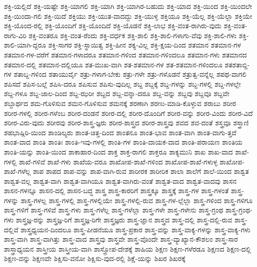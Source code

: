 {ಶಕ್ತಿ-ಯಲ್ಲಿದೆ
ಶಕ್ತಿ-ಯಷ್ಟೇ
ಶಕ್ತಿ-ಯಾಗಲಿ
ಶಕ್ತಿ-ಯಾಗಿ
ಶಕ್ತಿ-ಯಾಗಿರ-ಬಹುದು
ಶಕ್ತಿ-ಯಾದ
ಶಕ್ತಿ-ಯಿಂದ
ಶಕ್ತಿ-ಯಿಂದಲೇ
ಶಕ್ತಿ-ಯಿಂದಾ-ಗಲಿ
ಶಕ್ತಿ-ಯಿದೆ
ಶಕ್ತಿಯು
ಶಕ್ತಿ-ಯುತ-ವಾದದ್ದು
ಶಕ್ತಿ-ಯುಳ್ಳ
ಶಕ್ತಿಯೂ
ಶಕ್ತಿ-ಯೆಲ್ಲ
ಶಕ್ತಿ-ಯೆಲ್ಲಾ
ಶಕ್ತಿಯೇ
ಶಕ್ತಿ-ಯೊಂದ-ರಲ್ಲಿ
ಶಕ್ತಿ-ಯೊಂದಿಗೆ
ಶಕ್ತಿ-ಯೊಂದಿದೆ
ಶಕ್ತಿ-ಯೊಡನೆ
ಶಕ್ತಿ-ಲಾಭ
ಶಕ್ತಿ-ವಂತ-ರಾಗಿರು-ವುದು
ಶಕ್ತಿ-ವಂತ-ರಾಗು-ವಿರಿ
ಶಕ್ತಿ-ವಂತರೂ
ಶಕ್ತಿ-ವಂತ-ರೆಂದು
ಶಕ್ತಿ-ವರ್ಧಕ
ಶಕ್ತಿ-ಶಾಲಿ
ಶಕ್ತಿ-ಶಾಲಿ-ಗಳಾಗು-ವೆವು
ಶಕ್ತಿ-ಶಾಲಿ-ಗಳು
ಶಕ್ತಿ-ಶಾಲಿ-ಯಾಗಿ-ದ್ದರೂ
ಶಕ್ತಿ-ಸಾಗರ
ಶಕ್ತಿ-ಸ್ಥಾಯಿತ್ವ
ಶಕ್ತಿ-ಹೀನ
ಶಕ್ಯ-ವಿಲ್ಲ
ಶಕ್ತಿ-ಕ್ಷಯ-ದಿಂದ
ಶತಮಾನ
ಶತಮಾನ-ಗಳ
ಶತಮಾನ-ಗಳ-ವರೆಗೆ
ಶತಮಾನ-ಗಳಾದರೂ
ಶತಮಾನ-ಗಳಿಂದ
ಶತಮಾನ-ಗಳಿಂದಲೂ
ಶತಮಾನ-ಗಳು
ಶತಮಾನದ
ಶತಮಾನ-ದಲ್ಲಿ
ಶತಮಾನ-ದಲ್ಲಿಯೂ
ಶತ-ಮುಖ-ವಾಗಿ
ಶತ-ಶತಮಾನ-ಗಳ
ಶತ-ಶತಮಾನ-ಗಳಿಂದಲೂ
ಶತಶತಾಬ್ದಿ-ಗಳ
ಶತಾಬ್ದ-ಗಳಿಂದ
ಶತಾಯುರ್ವೈ
ಶತ್ರು-ಗಳಾಗ-ಬೇಕು
ಶತ್ರು-ಗಳೇ
ಶತ್ರು-ಗಳೊಡನೆ
ಶತ್ರುತ್ವ-ವನ್ನೆಲ್ಲ
ಶಪಥ-ವಾಗಲಿ
ಶಪಿಸದೆ
ಶಪಿಸ-ಬಲ್ಲೆ
ಶಪಿಸಿ-ದರೂ
ಶಪಿಸುವ
ಶಪಿಸು-ವುದಿಲ್ಲ
ಶಬ್ದ
ಶಬ್ದಕ್ಕೆ
ಶಬ್ದ-ಗಳನ್ನು
ಶಬ್ದ-ಗಳಲ್ಲಿ
ಶಬ್ದ-ಗಳಲ್ಲೇ
ಶಬ್ದ-ಗಳೂ
ಶಬ್ದ-ಜಾಲ-ದಿಂದ
ಶಬ್ದ-ಝರೀ
ಶಬ್ದದ
ಶಬ್ದ-ವನ್ನಾ-ದರೂ
ಶಬ್ದ-ವನ್ನು
ಶಬ್ದವು
ಶಬ್ದವೂ
ಶಬ್ದವೇ
ಶಬ್ದಾರ್ಥದ
ಶಮ-ಗೊಳಿಸುವ
ಶಮನ-ಗೊಳಿಸುವ
ಶಮನಕ್ಕೆ
ಶರಣಾಗಿ
ಶರಣು-ಮಾಡಿ-ಕೊಳ್ಳುವ
ಶರಾಬು
ಶರೀರ
ಶರೀರ-ಗಳಲ್ಲಿ
ಶರೀರ-ಗಳೆಂಬ
ಶರೀರ-ದಂಡನೆ
ಶರೀರ-ದಲ್ಲಿ
ಶರೀರ-ದೊಂದಿಗೆ
ಶರೀರ-ವನ್ನು
ಶರೀರ-ವಿಂದು
ಶರೀರ-ವಿದೆ
ಶರೀರ-ವಿರು-ವುದು
ಶರೀರವು
ಶರೀರ-ಶಾಸ್ತ್ರ-ಜ್ಞರು
ಶರೀರ-ಶಾಸ್ತ್ರದ
ಶರೀರ-ಶಾಸ್ತ್ರವು
ಶವದ
ಶವ-ದಂತೆ
ಶಸ್ತ್ರವೂ
ಶಸ್ತ್ರಾಣಿ
ಶಹಭಾಷ್ಗಿರಿ-ಯಿಂದ
ಶಾಂಡಿಲ್ಯರು
ಶಾಂತ-ಚಿತ್ತ-ದಿಂದ
ಶಾಂತನೂ
ಶಾಂತ-ಭಾವ
ಶಾಂತ-ವಾಗಿ
ಶಾಂತ-ವಾಗು-ತ್ತದೆ
ಶಾಂತ-ವಾದ
ಶಾಂತಿ
ಶಾಂತಿಃ
ಶಾಂತಿ-ಇವು-ಗಳಲ್ಲಿ
ಶಾಂತಿ-ಗಳ
ಶಾಂತಿ-ದಾಯಕ-ವಾದ
ಶಾಂತಿ-ಪರಾಯಣ
ಶಾಂತಿಯ
ಶಾಂತಿ-ಯನ್ನು
ಶಾಂತಿ-ಯಿಂದ
ಶಾಕಾಹಾರ-ದಿಂದ
ಶಾಕ್ತ
ಶಾಕ್ತ-ರಾಗಲಿ
ಶಾಕ್ತರೂ
ಶಾಕ್ಯಮುನಿ
ಶಾಖ
ಶಾಖ-ವಾದ
ಶಾಖೆ-ಗಳಲ್ಲಿ
ಶಾಖೆ-ಗಳಿವೆ
ಶಾಖೆ-ಗಳು
ಶಾಖೆಯ-ವರೂ
ಶಾಖೋಪ-ಶಾಖೆ-ಗಳಿಂದ
ಶಾಖೋಪ-ಶಾಖೆ-ಗಳುಳ್ಳ
ಶಾಖೋಪ-ಶಾಖೆ-ಗಳೆಲ್ಲ
ಶಾಪ
ಶಾಪದ
ಶಾಪ-ವನ್ನು
ಶಾಪ-ವಾಗಿ-ರುವ
ಶಾರೀರಕ
ಶಾರೀರಿಕ
ಶಾಲಾ
ಶಾಲೆಗೆ
ಶಾಲೆ-ಯಿಂದ
ಶಾಶ್ವತ
ಶಾಶ್ವತ-ವಲ್ಲ
ಶಾಶ್ವತ-ವಾಗಿ
ಶಾಶ್ವತ-ವಾಗಿಯೂ
ಶಾಶ್ವತ-ವಾಗಿರು-ವಂತೆ
ಶಾಶ್ವತ-ವಾದ
ಶಾಶ್ವತ-ವಾದವು
ಶಾಸನ
ಶಾಸನ-ಗಳನ್ನೂ
ಶಾಸನ-ದಲ್ಲಿ
ಶಾಸನ-ಬದ್ಧ
ಶಾಸ್ತ್ರ
ಶಾಸ್ತ್ರ-ಕಾರರಿಗೆ
ಶಾಸ್ತ್ರಕ್ಕೂ
ಶಾಸ್ತ್ರಕ್ಕೆ
ಶಾಸ್ತ್ರ-ಗಳ
ಶಾಸ್ತ್ರ-ಗಳಂತೆ
ಶಾಸ್ತ್ರ-ಗಳನ್ನು
ಶಾಸ್ತ್ರ-ಗಳಲ್ಲ
ಶಾಸ್ತ್ರ-ಗಳಲ್ಲಿ
ಶಾಸ್ತ್ರ-ಗಳಲ್ಲಿಯೇ
ಶಾಸ್ತ್ರ-ಗಳಲ್ಲಿ-ರುವ
ಶಾಸ್ತ್ರ-ಗಳ-ಲ್ಲೆಲ್ಲಾ
ಶಾಸ್ತ್ರ-ಗಳಿಂದ
ಶಾಸ್ತ್ರ-ಗಳಿಗೂ
ಶಾಸ್ತ್ರ-ಗಳಿಗೆ
ಶಾಸ್ತ್ರ-ಗಳಿವೆ
ಶಾಸ್ತ್ರ-ಗಳು
ಶಾಸ್ತ್ರ-ಗಳೆಲ್ಲ
ಶಾಸ್ತ್ರ-ಗಳೆಲ್ಲಾ
ಶಾಸ್ತ್ರ-ಗಳೇ
ಶಾಸ್ತ್ರ-ಗಳೇನು
ಶಾಸ್ತ್ರ-ಗ್ರಂಥ
ಶಾಸ್ತ್ರ-ಗ್ರಂಥ-ಗಳು
ಶಾಸ್ತ್ರಜ್ಞ-ರನ್ನು
ಶಾಸ್ತ್ರಜ್ಞ-ರಿಗೆ
ಶಾಸ್ತ್ರಜ್ಞ-ರಿಗೇ
ಶಾಸ್ತ್ರಜ್ಞರು
ಶಾಸ್ತ್ರ-ಜ್ಞಾನ
ಶಾಸ್ತ್ರದ
ಶಾಸ್ತ್ರ-ದಲ್ಲಿ
ಶಾಸ್ತ್ರ-ದಲ್ಲಿ-ರುವ
ಶಾಸ್ತ್ರ-ದಲ್ಲಿವೆ
ಶಾಸ್ತ್ರಧ್ಯಯನ-ದಿಂದಲೂ
ಶಾಸ್ತ್ರ-ಪೀಡನೆಯೂ
ಶಾಸ್ತ್ರ-ಪ್ರಕಾರ
ಶಾಸ್ತ್ರ-ವನ್ನು
ಶಾಸ್ತ್ರ-ವಾಕ್ಯ-ಗಳನ್ನು
ಶಾಸ್ತ್ರ-ವಾಕ್ಯ-ಗಳು
ಶಾಸ್ತ್ರ-ವಾಗಿ
ಶಾಸ್ತ್ರ-ವಾಗಿತ್ತು
ಶಾಸ್ತ್ರ-ವಾದ
ಶಾಸ್ತ್ರವು
ಶಾಸ್ತ್ರವೇ
ಶಾಸ್ತ್ರ-ವೊಂದೇ
ಶಾಸ್ತ್ರ-ವ್ಯಾಖ್ಯಾನ-ಕೌಶಲಂ
ಶಾಸ್ತ್ರ-ಸಾರ
ಶಾಸ್ತ್ರಾಧ್ಯಯನ
ಶಾಸ್ತ್ರೀಯ
ಶಾಸ್ತ್ರೀಯ-ವಾಗಿ
ಶಾಸ್ತ್ರೋಪ-ದೇಶಕ್ಕೆ
ಶಾಹಿಯ
ಶಿಕ್ಷಣ
ಶಿಕ್ಷಣ-ಗಳೆರಡೂ
ಶಿಕ್ಷಣದ
ಶಿಕ್ಷಣ-ದಲ್ಲಿ
ಶಿಕ್ಷಣ-ವನ್ನು
ಶಿಕ್ಷಣವೇ
ಶಿಕ್ಷಿಸು-ವನೋ
ಶಿಕ್ಷಿಸು-ವುದ-ರಲ್ಲಿ
ಶಿಕ್ಷೆ-ಯನ್ನು
ಶಿಖರ
ಶಿಖರಕ್ಕೆ
}
